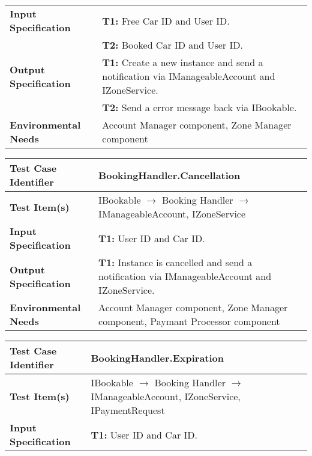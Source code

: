 {\begin{tabularx}{\textwidth}{l X}
    \textbf{Input Specification} & \textbf{T1:} Free Car ID and User ID. \\
                                & \textbf{T2:} Booked Car ID and User ID. \\
    \hline 
    
    \textbf{Output Specification} & \textbf{T1:} Create a new instance and send a notification via IManageableAccount and IZoneService.\\
                                & \textbf{T2:} Send a error message back via IBookable.\\
    \hline 
    
    \textbf{Environmental Needs} & Account Manager component, Zone Manager component\\
    \hline
\end{tabularx}
\bigskip 

\noindent
\begin{tabularx}{\textwidth}{l X}
    \hline 
    \textbf{Test Case Identifier} & BookingHandler.Cancellation\\ 
    \hline 
    
    \textbf{Test Item(s)} & IBookable $\rightarrow$ Booking Handler $\rightarrow$ IManageableAccount, IZoneService\\
    \hline 
    
    \textbf{Input Specification} & \textbf{T1:} User ID and Car ID. \\
    \hline 
    
    \textbf{Output Specification} & \textbf{T1:} Instance is cancelled and send a notification via IManageableAccount and IZoneService.\\
    \hline 
    
    \textbf{Environmental Needs} & Account Manager component, Zone Manager component, Paymant Processor component\\
    \hline
\end{tabularx}
\bigskip 

\noindent
\begin{tabularx}{\textwidth}{l X}
    \hline 
    \textbf{Test Case Identifier} & BookingHandler.Expiration\\ %
    \hline 
    
    \textbf{Test Item(s)} & IBookable $\rightarrow$ Booking Handler $\rightarrow$ IManageableAccount, IZoneService, IPaymentRequest\\
    \hline 
    
    \textbf{Input Specification} & \textbf{T1:} User ID and Car ID. \\
    \hline 
    

\end{tabularx}}
